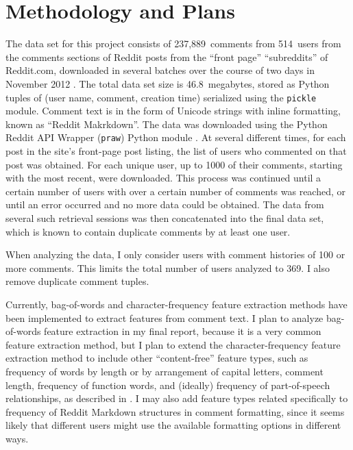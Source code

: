 \documentclass{article}
\begin{document}
\section{Methodology and Plans}
The data set for this project consists of 237,889~comments from 514~users from the comments sections of Reddit posts from the ``front page'' ``subreddits'' of Reddit.com, downloaded in several batches over the course of two days in November 2012 \cite{reddit2012reddit}. The total data set size is 46.8~megabytes, stored as Python tuples of (user name, comment, creation time) serialized using the \texttt{pickle} module. Comment text is in the form of Unicode strings with inline formatting, known as ``Reddit Makrkdown''. The data was downloaded using the Python Reddit API Wrapper (\texttt{praw}) Python module \cite{boe2012python}. At several different times, for each post in the site's front-page post listing, the list of users who commented on that post was obtained. For each unique user, up to 1000 of their comments, starting with the most recent, were downloaded. This process was continued until a certain number of users with over a certain number of comments was reached, or until an error occurred and no more data could be obtained. The data from several such retrieval sessions was then concatenated into the final data set, which is known to contain duplicate comments by at least one user.

When analyzing the data, I only consider users with comment histories of 100 or more comments. This limits the total number of users analyzed to 369. I also remove duplicate comment tuples.

Currently, bag-of-words and character-frequency feature extraction methods have been implemented to extract features from comment text. I plan to analyze bag-of-words feature extraction in my final report, because it is a very common feature extraction method, but I plan to extend the character-frequency feature extraction method to include other ``content-free'' feature types, such as frequency of words by length or by arrangement of capital letters, comment length, frequency of function words, and (ideally) frequency of part-of-speech relationships, as described in \cite{narayanan2012feasibility}. I may also add feature types related specifically to frequency of Reddit Markdown structures in comment formatting, since it seems likely that different users might use the available formatting options in different ways.
\end{document}
